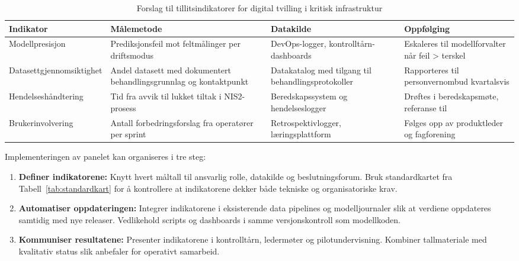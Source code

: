 \begin{table}[ht]
    \centering
    \caption{Forslag til tillitsindikatorer for digital tvilling i kritisk infrastruktur}
    \label{tab:tillitsindikatorer}
    \begin{tabular}{|p{3.2cm}|p{4.2cm}|p{4.2cm}|p{3.2cm}|}
        \hline
        \textbf{Indikator} & \textbf{Målemetode} & \textbf{Datakilde} & \textbf{Oppfølging} \\
        \hline
        Modellpresisjon & Prediksjonsfeil mot feltmålinger per driftsmodus & DevOps-logger, kontrolltårn-dashboards & Eskaleres til modellforvalter når feil > terskel \citep{dnv2023digitalassurance} \\
        \hline
        Datasettgjennomsiktighet & Andel datasett med dokumentert behandlingsgrunnlag og kontaktpunkt & Datakatalog med tilgang til behandlingsprotokoller & Rapporteres til personvernombud kvartalsvis \\
        \hline
        Hendelseshåndtering & Tid fra avvik til lukket tiltak i NIS2-prosess & Beredskapssystem og hendelseslogger & Drøftes i beredskapsmøte, referanse til \citet{eu2022nis2} \\
        \hline
        Brukerinvolvering & Antall forbedringsforslag fra operatører per sprint & Retrospektivlogger, læringsplattform & Følges opp av produktleder og fagforening \\
        \hline
    \end{tabular}
\end{table}

Implementeringen av panelet kan organiseres i tre steg:
\begin{enumerate}
    \item \textbf{Definer indikatorene:} Knytt hvert måltall til ansvarlig rolle, datakilde og beslutningsforum. Bruk standardkartet fra Tabell~\ref{tab:standardkart} for å kontrollere at indikatorene dekker både tekniske og organisatoriske krav.
    \item \textbf{Automatiser oppdateringen:} Integrer indikatorene i eksisterende data pipelines og modelljournaler slik at verdiene oppdateres samtidig med nye releaser. Vedlikehold scripts og dashboards i samme versjonskontroll som modellkoden.
    \item \textbf{Kommuniser resultatene:} Presenter indikatorene i kontrolltårn, ledermøter og pilotundervisning. Kombiner tallmateriale med kvalitativ status slik \citet{statnett2024kontrolltarn} anbefaler for operativt samarbeid.
\end{enumerate}

